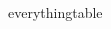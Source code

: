 \documentclass[12pt,twoside]{report}
\begin{document}
\begin{figure}
\begin{adjustwidth}{-1cm}{-1cm}
\begin{tabular}{c|cccccc}
    




  \end{tabular}
\end{adjustwidth}
\caption{everythingtable}
\label{fig:everythingtable}
\end{figure}
\end{document}
